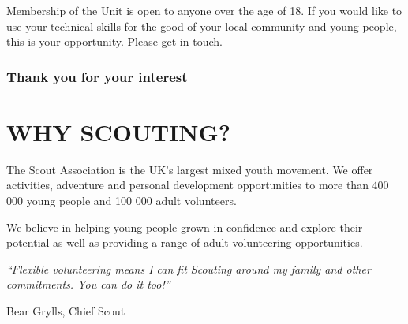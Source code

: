 \documentclass[12pt,foldmark]{leaflet}
\begin{document}
Membership of the Unit is open to anyone over the age of 18. If you would like to use your technical skills for the good of your local community and young people, this is your opportunity. Please get in touch.
\vfill
\subsubsection{Thank you for your interest}
\newpage

\withrotationtrue
\section{WHY SCOUTING?}
\withrotationfalse
The Scout Association is the UK's largest mixed youth movement. We offer activities, adventure and personal development opportunities to more than 400 000 young people and 100 000 adult volunteers.

We believe in helping young people grown in confidence and explore their potential as well as providing a range of adult volunteering opportunities.
\vfill
\epigraph{\textit{``Flexible volunteering means I can fit Scouting around my family and other commitments. You can do it too!''}}{Bear Grylls, Chief Scout}

\newpage




\end{document}
